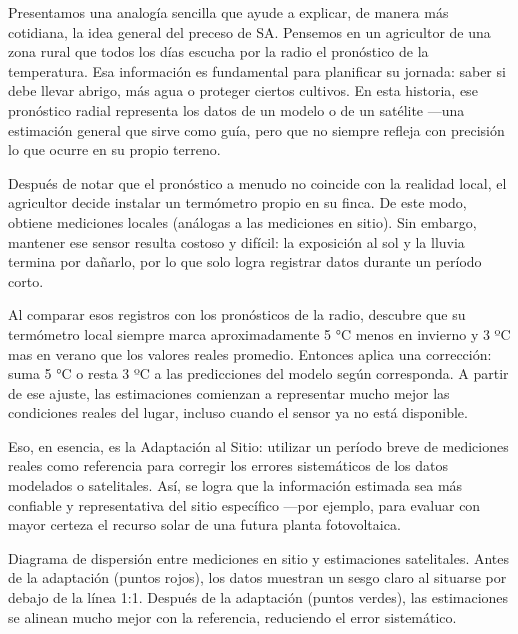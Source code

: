\documentclass[letterpaper,12pt, twoside]{report}
\providecommand{\DIFdeltex}[1]{{\protect\color{red} \scriptsize #1}} %
\providecommand{\DIFdelFL}[1]{\DIFdel{#1}} %
\providecommand{\DIFdel}[1]{\texorpdfstring{\DIFdeltex{#1}}{}} %
\begin{document}
\DIFdel{Presentamos una analogía sencilla que ayude a explicar, de manera más cotidiana, la idea general del preceso de SA.
}%
\DIFdel{Pensemos en un agricultor de una zona rural que todos los días escucha por la radio el pronóstico de la temperatura. Esa información es fundamental para planificar su jornada: saber si debe llevar abrigo, más agua o proteger ciertos cultivos. En esta historia, ese pronóstico radial representa los datos de un modelo o de un satélite —una estimación general que sirve como guía, pero que no siempre refleja con precisión lo que ocurre en su propio terreno.
}%

\DIFdel{Después de notar que el pronóstico a menudo no coincide con la realidad local, el agricultor decide instalar un termómetro propio en su finca. De este modo, obtiene mediciones locales (análogas a las mediciones en sitio). Sin embargo, mantener ese sensor resulta costoso y difícil: la exposición al sol y la lluvia termina por dañarlo, por lo que solo logra registrar datos durante un período corto.
}%

\DIFdel{Al comparar esos registros con los pronósticos de la radio, descubre que su termómetro local siempre marca aproximadamente 5 °C menos en invierno y 3 ºC mas en verano que los valores reales promedio. Entonces aplica una corrección: suma 5 °C o resta 3 ºC a las predicciones del modelo según corresponda. A partir de ese ajuste, las estimaciones comienzan a representar mucho mejor las condiciones reales del lugar, incluso cuando el sensor ya no está disponible.
}%

\DIFdel{Eso, en esencia, es la Adaptación al Sitio: utilizar un período breve de mediciones reales como referencia para corregir los errores sistemáticos de los datos modelados o satelitales. Así, se logra que la información estimada sea más confiable y representativa del sitio específico —por ejemplo, para evaluar con mayor certeza el recurso solar de una futura planta fotovoltaica.
}%

{%
\DIFdelFL{Diagrama de dispersión entre mediciones en sitio y estimaciones satelitales.
Antes de la adaptación (puntos rojos), los datos muestran un sesgo claro al situarse por debajo de la línea 1:1. 
Después de la adaptación (puntos verdes), las estimaciones se alinean mucho mejor con la referencia, reduciendo el error sistemático.}}
\end{document}
